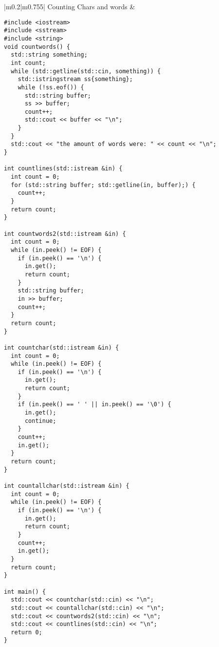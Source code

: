 \documentclass[main.tex,fontsize=8pt,paper=a4,paper=portrait,DIV=calc,]{scrartcl}
\begin{document}
\pagebreak
\begin{table}[ht!]
\begin{tabular}{|m{0.2\linewidth}|m{0.755\linewidth}|}
\hline
Counting Chars and words & 
\vspace{2mm}
\begin{lstlisting}
#include <iostream>
#include <sstream>
#include <string>
void countwords() {
  std::string something;
  int count;
  while (std::getline(std::cin, something)) {
    std::istringstream ss{something};
    while (!ss.eof()) {
      std::string buffer;
      ss >> buffer;
      count++;
      std::cout << buffer << "\n";
    }
  }
  std::cout << "the amount of words were: " << count << "\n";
}

int countlines(std::istream &in) {
  int count = 0;
  for (std::string buffer; std::getline(in, buffer);) {
    count++;
  }
  return count;
}

int countwords2(std::istream &in) {
  int count = 0;
  while (in.peek() != EOF) {
    if (in.peek() == '\n') {
      in.get();
      return count;
    }
    std::string buffer;
    in >> buffer;
    count++;
  }
  return count;
}

int countchar(std::istream &in) {
  int count = 0;
  while (in.peek() != EOF) {
    if (in.peek() == '\n') {
      in.get();
      return count;
    }
    if (in.peek() == ' ' || in.peek() == '\0') {
      in.get();
      continue;
    }
    count++;
    in.get();
  }
  return count;
}

int countallchar(std::istream &in) {
  int count = 0;
  while (in.peek() != EOF) {
    if (in.peek() == '\n') {
      in.get();
      return count;
    }
    count++;
    in.get();
  }
  return count;
}

int main() {
  std::cout << countchar(std::cin) << "\n";
  std::cout << countallchar(std::cin) << "\n";
  std::cout << countwords2(std::cin) << "\n";
  std::cout << countlines(std::cin) << "\n";
  return 0;
}
\end{lstlisting}
\\
\hline
\end{tabular}
\end{table}
\end{document}
